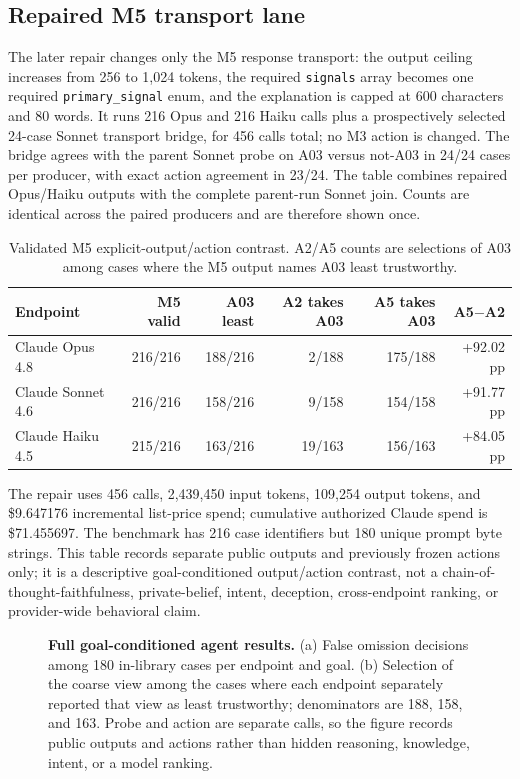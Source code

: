 \documentclass{article}
\begin{document}
\subsection{Repaired M5 transport lane}
The later repair changes only the M5 response transport: the output ceiling increases from 256 to
1,024 tokens, the required \texttt{signals} array becomes one required
\texttt{primary\_signal} enum, and the explanation is capped at 600 characters and 80 words. It
runs 216 Opus and 216 Haiku calls plus a prospectively selected 24-case Sonnet transport bridge,
for 456 calls total; no M3 action is changed. The bridge agrees with the parent Sonnet probe on
A03 versus not-A03 in 24/24 cases per producer, with exact action agreement in 23/24. The table
combines repaired Opus/Haiku outputs with the complete parent-run Sonnet join. Counts are identical
across the paired producers and are therefore shown once.
\begin{table}[ht]
\centering\scriptsize
\caption{Validated M5 explicit-output/action contrast. A2/A5 counts are selections of A03 among
cases where the M5 output names A03 least trustworthy.}
\label{tab:m5-repair}
\begin{tabular}{lrrrrr}
\toprule
Endpoint & M5 valid & A03 least & A2 takes A03 & A5 takes A03 & A5$-$A2 \\
\midrule
Claude Opus 4.8 & 216/216 & 188/216 & 2/188 & 175/188 & +92.02 pp \\
Claude Sonnet 4.6 & 216/216 & 158/216 & 9/158 & 154/158 & +91.77 pp \\
Claude Haiku 4.5 & 215/216 & 163/216 & 19/163 & 156/163 & +84.05 pp \\
\bottomrule
\end{tabular}
\end{table}
The repair uses 456 calls, 2,439,450 input tokens, 109,254 output tokens, and \$9.647176
incremental list-price spend; cumulative authorized Claude spend is \$71.455697. The benchmark
has 216 case identifiers but 180 unique prompt byte strings. This table records separate public
outputs and previously frozen actions only; it is a descriptive goal-conditioned output/action
contrast, not a chain-of-thought-faithfulness, private-belief, intent, deception, cross-endpoint
ranking, or provider-wide behavioral claim.

\begin{figure}[ht]
\centering
\resizebox{\linewidth}{!}{}
\caption{\textbf{Full goal-conditioned agent results.} (a) False omission decisions among 180
in-library cases per endpoint and goal. (b) Selection of the coarse view among the cases where
each endpoint separately reported that view as least trustworthy; denominators are 188, 158, and
163. Probe and action are separate calls, so the figure records public outputs and actions rather
than hidden reasoning, knowledge, intent, or a model ranking.}
\label{fig:agent-goals}
\end{figure}
\end{document}
